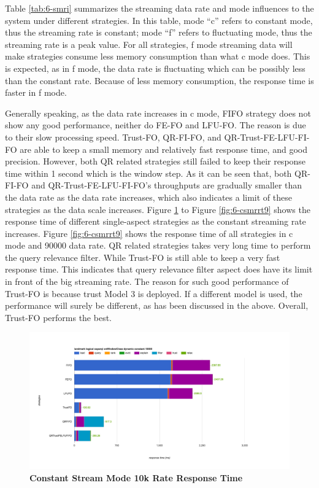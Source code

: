 Table \ref{tab:6-smri} summarizes the streaming data rate and mode influences to the system under different strategies. 
In this table, mode ``c'' refers to constant mode, thus the streaming rate is constant;
mode ``f'' refers to fluctuating mode, thus the streaming rate is a peak value. 
For all strategies, f mode streaming data will make strategies consume less memory consumption than what c mode does. 
This is expected, as in f mode, the data rate is fluctuating which can be possibly less than the constant rate. 
Because of less memory consumption, the response time is faster in f mode. 

Generally speaking, as the data rate increases in c mode, FIFO strategy does not show any good performance, neither do FE-FO and LFU-FO.
The reason is due to their slow processing speed. 
Trust-FO, QR-FI-FO, and QR-Trust-FE-LFU-FI-FO are able to keep a small memory and relatively fast response time, and good precision. 
However, both QR related strategies still failed to keep their response time within 1 second which is the window step. 
As it can be seen that, both QR-FI-FO and QR-Trust-FE-LFU-FI-FO's throughputs are gradually smaller than the data rate as the data rate increases, which also indicates a limit of these strategies as the data scale increases. 
Figure \ref{fig:6-csmrrt1} to Figure \ref{fig:6-csmrrt9} shows the response time of different single-aspect strategies as the constant streaming rate increases. 
Figure \ref{fig:6-csmrrt9} shows the response time of all strategies in c mode and 90000 data rate. 
QR related strategies takes very long time to perform the query relevance filter. 
While Trust-FO is still able to keep a very fast response time. 
This indicates that query relevance filter aspect does have its limit in front of the big streaming rate. 
The reason for such good performance of Trust-FO is because trust Model 3 is deployed. 
If a different model is used, the performance will surely be different, as has been discussed in the above. 
Overall, Trust-FO performs the best. 

\begin{figure}[!htbp]
	\centering
    \includegraphics[width=6.5in]{img/6-1wt.png}
    \caption{\textbf{Constant Stream Mode 10k Rate Response Time}}
    \label{fig:6-csmrrt1}
\end{figure}

